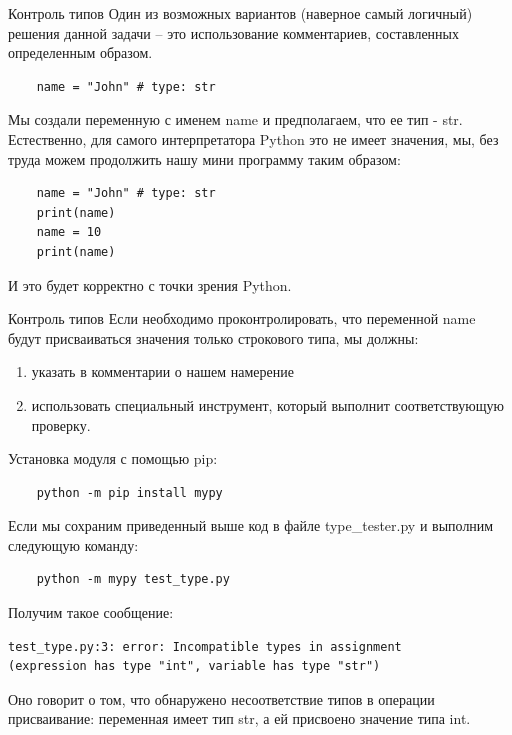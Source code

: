 \documentclass[xcolor=table]{beamer}
\begin{document}
\begin{frame}[fragile]{Контроль типов}
	Один из возможных вариантов (наверное самый логичный) решения данной задачи -- это использование
комментариев, составленных определенным образом. 

	\begin{verbatim}
	name = "John" # type: str
	\end{verbatim}
	
	Мы создали переменную с именем name и предполагаем, что ее тип - str. Естественно, для самого интерпретатора Python это не имеет значения, мы, без труда можем продолжить нашу мини программу таким образом:
	\begin{verbatim}
	name = "John" # type: str
	print(name)
	name = 10
	print(name)	
	\end{verbatim}
	И это будет корректно с точки зрения Python.
\end{frame}

\begin{frame}[fragile]{Контроль типов}
	Если необходимо проконтролировать, что переменной name будут присваиваться значения только строкового типа, мы должны: 
	\begin{enumerate}
		\item указать в комментарии о нашем намерение
		\item использовать специальный инструмент, который выполнит соответствующую проверку.	
	\end{enumerate}

	Установка модуля с помощью pip:
	\begin{verbatim}
	python -m pip install mypy
	\end{verbatim}
	
	Если мы сохраним приведенный выше код в файле type\_tester.py и выполним следующую команду:

	\begin{verbatim}
	python -m mypy test_type.py
	\end{verbatim}
	Получим такое сообщение:
	\begin{verbatim}
test_type.py:3: error: Incompatible types in assignment
(expression has type "int", variable has type "str")
	\end{verbatim}
	Оно говорит о том, что обнаружено несоответствие типов в операции присваивание: переменная имеет тип str, а ей присвоено значение типа int.
\end{frame}
\end{document}

